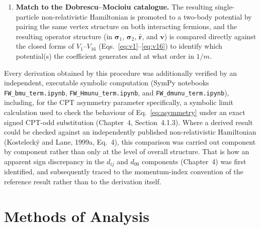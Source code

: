 \begin{enumerate}
    solution of momentum $-\mathbf p$ and spin $-\mathbf s$, with the
    opposite energy. The particle is compared with its CPT-conjugate
    antiparticle, of the same momentum and reversed spin, which gives
    $H^{\bar f}_{NR}(\mathbf p,\boldsymbol\sigma)=-H_{\rm lower}(-\mathbf p,
    \boldsymbol\sigma)$. This route was adopted in preference to a
    charge-conjugation argument on the bilinear
    $\bar\psi\gamma_5\gamma^\mu\psi$ after that bilinear was verified, with
    the same Dirac-algebra tooling, to be even under $C$ for every $\mu$
    and therefore unable by itself to produce a sign difference. The
    comparison was verified for every coefficient family against each
    coefficient's CPT parity and against Kostelecký and Lane's (1999b)
    antiparticle rule at fixed spin.
  \item \textbf{Match to the Dobrescu--Mocioiu catalogue.} The resulting
    single-particle non-relativistic Hamiltonian is promoted to a two-body
    potential by pairing the same vertex structure on both interacting
    fermions, and the resulting operator structure (in $\boldsymbol\sigma_1$,
    $\boldsymbol\sigma_2$, $\hat{\mathbf r}$, and $\mathbf v$) is compared
    directly against the closed forms of $V_1$--$V_{16}$
    (Eqs.~\ref{eq:v1}--\ref{eq:v16}) to identify which potential(s) the
    coefficient generates and at what order in $1/m$.
\end{enumerate}

Every derivation obtained by this procedure was additionally verified by an
independent, executable symbolic computation (SymPy notebooks
\texttt{FW\_bmu}\allowbreak\texttt{\_term.ipynb},
\texttt{FW\_Hmunu}\allowbreak\texttt{\_term.ipynb}, and
\texttt{FW\_dmunu}\allowbreak\texttt{\_term.ipynb}), including, for the CPT asymmetry parameter
specifically, a symbolic limit calculation used to check the behaviour of
Eq.~\eqref{eq:asymmetry} under an exact signed CPT-odd substitution
(Chapter~4, Section~4.1.3). Where a derived result could be checked against
an independently published non-relativistic Hamiltonian (Kostelecký and
Lane, 1999a, Eq.~4), this comparison was carried out component by component
rather than only at the level of overall structure. That is how an apparent
sign discrepancy in the $d_{ij}$ and $d_{00}$ components (Chapter~4) was
first identified, and subsequently traced to the momentum-index convention
of the reference result rather than to the derivation itself.

\section{Methods of Analysis}
\label{sec:analysis-methods}

